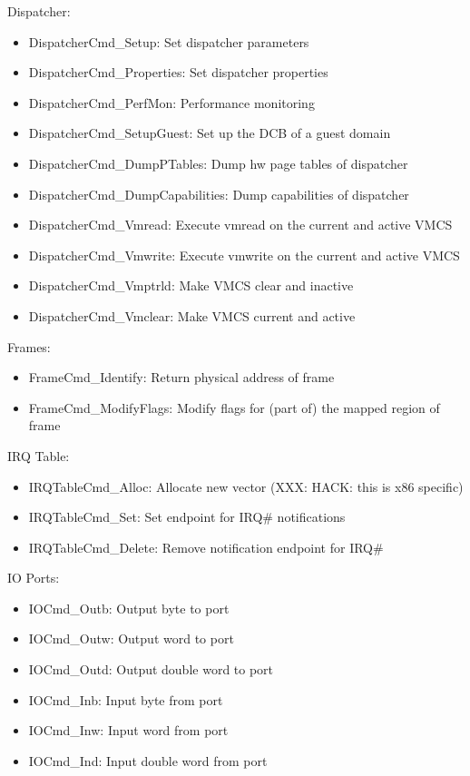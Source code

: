 \documentclass[a4paper,11pt,twoside]{report}
\begin{document}
{{Dispatcher:
\begin{itemize}
\item DispatcherCmd\_Setup: Set dispatcher parameters
\item DispatcherCmd\_Properties: Set dispatcher properties
\item DispatcherCmd\_PerfMon: Performance monitoring
\item DispatcherCmd\_SetupGuest: Set up the DCB of a guest domain
\item DispatcherCmd\_DumpPTables: Dump hw page tables of dispatcher
\item DispatcherCmd\_DumpCapabilities: Dump capabilities of dispatcher
\item DispatcherCmd\_Vmread: Execute vmread on the current and active VMCS
\item DispatcherCmd\_Vmwrite: Execute vmwrite on the current and active VMCS
\item DispatcherCmd\_Vmptrld: Make VMCS clear and inactive
\item DispatcherCmd\_Vmclear: Make VMCS current and active
\end{itemize}

Frames:
\begin{itemize}
\item FrameCmd\_Identify: Return physical address of frame
\item FrameCmd\_ModifyFlags: Modify flags for (part of) the mapped region of frame
\end{itemize}

IRQ Table:
\begin{itemize}
\item IRQTableCmd\_Alloc: Allocate new vector (XXX: HACK: this is x86 specific)
\item IRQTableCmd\_Set: Set endpoint for IRQ# notifications
\item IRQTableCmd\_Delete: Remove notification endpoint for IRQ#
\end{itemize}

IO Ports:
\begin{itemize}
\item IOCmd\_Outb: Output byte to port
\item IOCmd\_Outw: Output word to port
\item IOCmd\_Outd: Output double word to port
\item IOCmd\_Inb: Input byte from port
\item IOCmd\_Inw: Input word from port
\item IOCmd\_Ind: Input double word from port
\end{itemize}

}}
\end{document}
